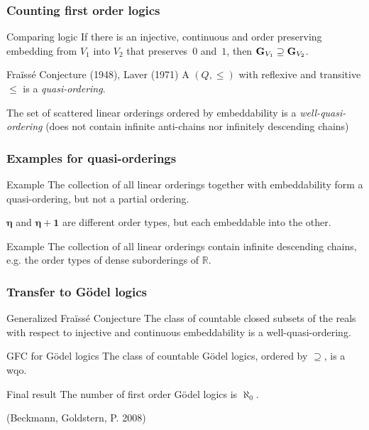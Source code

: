 \documentclass[aspectratio=169]%
  {beamer}
\newcommand{\bbR}{\mathbb{R}}
\newcommand{\gdl}[1]{{\bf G}_{#1}}
\begin{document}
\begin{frame}
  \frametitle{Counting first order logics}

  \begin{block}{Comparing logic}
    If there is an injective, continuous and order preserving
    embedding from $V_1$ into $V_2$ that preserves~$0$ and~$1$, then
    $\gdl{V_1}\supseteq\gdl{V_2}$.
  \end{block}

  \pause
  \begin{block}{Fraïssé  Conjecture (1948), Laver (1971)}
    A $(Q,\le)$ with reflexive and transitive $\le$ is a
    \emph{quasi-ordering}.

    The set of scattered linear orderings ordered by embeddability is
    a \emph{well-quasi-ordering} (does not contain infinite
    anti-chains nor infinitely descending chains)
  \end{block}
\end{frame}

\begin{frame}
  \frametitle{Examples for quasi-orderings}

  \begin{block}{Example}
    The collection of all  linear orderings together with 
    embeddability form a quasi-ordering, but not a partial
    ordering.

    $\bm{\eta}$ and $\bm{\eta}+\mathbf{1}$ are different order types,
    but each embeddable into the other.
  \end{block}

  \pause
  \begin{block}{Example}
    The collection of all linear orderings contain infinite descending
    chains, e.g. the order types of dense suborderings of $\bbR$.
  \end{block}
\end{frame}

\begin{frame}
  \frametitle{Transfer to Gödel logics}

  \begin{block}{Generalized Fraïssé Conjecture}
    The class of countable closed subsets of the reals with respect to
    injective and continuous embeddability is a well-quasi-ordering.
  \end{block}

  \pause
  \begin{block}{GFC for Gödel logics}
    The class of countable Gödel logics, ordered by $\supseteq$, is a
    wqo. 
  \end{block}


  \pause
  \begin{block}{Final result}
    The number of first order Gödel logics is $\aleph_0$.
  \end{block}

  (Beckmann, Goldstern, P. 2008)

\end{frame}
\end{document}
